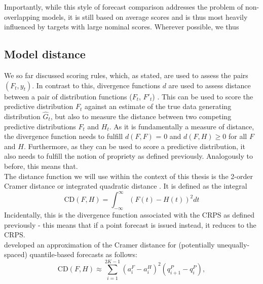 Importantly, while this style of forecast comparison addresses the problem of non-overlapping models, it is still based on average scores and is thus most heavily influenced by targets with large nominal scores. Wherever possible, we thus 
\subsection{Model distance}
We so far discussed scoring rules, which, as stated, are used to assess the pairs $(F_t, y_t)$. In contrast to this, divergence functions $d$ are used to assess distance between a pair of distribution functions ($F_t$, $F'_t$) \citep{thorarinsdottir_using_2013}. This can be used to score the predictive distribution $F_t$ against an estimate of the true data generating distribution $\hat{G}_t$, but also to measure the distance between two competing predictive distributions $F_t$ and $H_t$. As it is fundamentally a measure of distance, the divergence function needs to fulfill $d(F,F)$ = 0 and $d(F,H)\geq 0$ for all $F$ and $H$. Furthermore, as they can be used to score a predictive distribution, it also needs to fulfill the notion of propriety as defined previously. Analogously to before, this means that. \\
The distance function we will use within the context of this thesis is the 2-order Cramer distance or integrated quadratic distance \cite{thorarinsdottir_using_2013}. It is defined as the integral
\begin{equation}
\text{CD}(F, H) = \int_{-\infty}^{\infty}\left(F(t) - H(t) \right)^2dt
\end{equation}
Incidentally, this is the divergence function associated with the CRPS as defined previously - this means that if a point forecast is issued instead, it reduces to the CRPS.\\
\cite{wang_covidhubutils_2022} developed an approximation of the Cramer distance for (potentially unequally-spaced) quantile-based forecasts as follows:
\begin{equation}
\text{CD}(F,H) \approx \sum_{i = 1}^{2K-1} (a_i^F - a_i^H)^2 (q_{i+1}^{P} - q_{i}^{P}),
\end{equation} 
